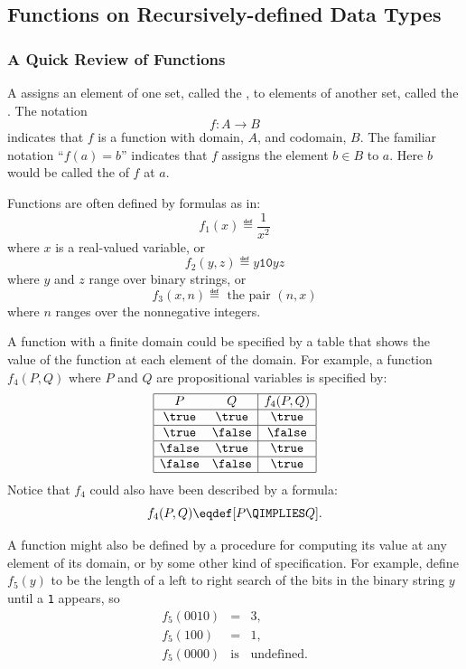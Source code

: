 \subsection{Functions on Recursively-defined Data Types}

\subsubsection{A Quick Review of Functions}\label{funcsubsec}

A  assigns an element of one set, called the
, to elements of another set, called the .
The notation
\[
f: A \to B
\]
indicates that $f$ is a function with domain, $A$, and codomain, $B$.  The
familiar notation ``$f(a) = b$'' indicates that $f$ assigns the element $b
\in B$ to $a$.  Here $b$ would be called the  of $f$ at
 $a$.

Functions are often defined by formulas as in:
\[
f_1(x) \eqdef \frac{1}{x^2}
\]
where $x$ is a real-valued variable, or
\[
f_2(y,z) \eqdef y\mathtt{10}yz
\]
where $y$ and $z$ range over binary strings, or
\[
f_3(x, n) \eqdef \text{ the pair } (n, x)
\]
where $n$ ranges over the nonnegative integers.

A function with a finite domain could be specified by a table that shows
the value of the function at each element of the domain.  For example, a function
$f_4(P,Q)$ where $P$ and $Q$ are propositional variables is specified by:
\[\begin{array}{|cc|c|}
\hline
P & Q & f_4(P,Q)\\
\hline \true & \true & \true\\
\hline \true & \false & \false\\
\hline \false & \true & \true\\
\hline \false & \false & \true\\
\hline
\end{array}\]
Notice that $f_4$ could also have been described by a formula:
\[
f_4(P,Q)  \eqdef [P \QIMPLIES Q].
\]

A function might also be defined by a procedure for computing its value at
any element of its domain, or by some other kind of specification.  For
example, define $f_5(y)$ to be the length of a left to right search of the
bits in the binary string $y$ until a \texttt{1} appears, so
\begin{eqnarray*}
f_5(0010) & = &  3,\\
f_5(100)  & = & 1,\\
f_5(0000) & \text{is} & \text{undefined}.
\end{eqnarray*}

